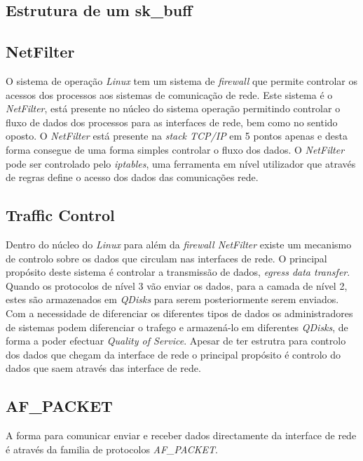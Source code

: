 \subsection{Estrutura de um sk\_buff}

\subsection{NetFilter}

O sistema de operação \textit{Linux} tem um sistema de \textit{firewall} que permite controlar os acessos dos processos aos sistemas de comunicação de rede.
 Este sistema é o \textit{NetFilter}, está presente no núcleo do sistema operação permitindo controlar o fluxo de dados dos processos para as interfaces de rede, bem como no sentido oposto.
 O \textit{NetFilter} está presente na \textit{stack TCP/IP} em 5 pontos apenas e desta forma consegue de uma forma simples controlar o fluxo dos dados.
 O \textit{NetFilter} pode ser controlado pelo \textit{iptables}, uma ferramenta em nível utilizador que através de regras define o acesso dos dados das comunicações rede.

\subsection{Traffic Control}
 Dentro do núcleo do \textit{Linux} para além da \textit{firewall NetFilter} existe um mecanismo de controlo sobre os dados que circulam nas interfaces de rede.
 O principal propósito deste sistema é controlar a transmissão de dados, \textit{egress data transfer}.
 Quando os protocolos de nível 3 vão enviar os dados, para a camada de nível 2, estes são armazenados em \textit{QDisks} para serem posteriormente serem enviados.
 Com a necessidade de diferenciar os diferentes tipos de dados os administradores de sistemas podem diferenciar o trafego e armazená-lo em diferentes \textit{QDisks}, de forma a poder efectuar \textit{Quality of Service}.
Apesar de ter estrutra para controlo dos dados que chegam da interface de rede o principal propósito é controlo do dados que saem através das interface de rede.



\subsection{AF\_PACKET}

A forma para comunicar enviar e receber dados directamente da interface de rede
é através da familia de protocolos \textit{AF\_PACKET}. 

